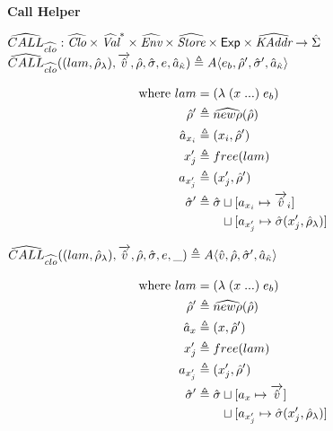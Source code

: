 \documentclass[12pt,draft]{article}
\newcommand{\A}[4]{A\langle #1 , #2 , #3 , #4 \rangle}
\begin{document}
\begin{multicols*}{2}
\begin{align*}
  \end{align*}
  \vfill\null
  \columnbreak
  \noindent\textbf{Call Helper}
  \begin{center}
    $\widehat{CALL}_{\widehat{clo}} : \widehat{\textit{Clo}} \times \widehat{\textit{Val}}^* \times \widehat{\textit{Env}}
    \times \widehat{\textit{Store}} \times \textsf{Exp} \times \widehat{\textit{KAddr}} \rightarrow \hat{\Sigma}$ \\
    $\aCALL_{\aclo}((lam , \aenv_{\lambda}) , \overrightarrow{\aval}, \aenv,\astore,e,\akaddr)
    \triangleq
    \A{e_b}{\aenv'}{\astore'}{\akaddr}$
  \end{center}
  \vspace{-7mm}
  \begin{align*}
    \text{where }
    lam &= (\lambda \; (x \; ...) \; e_b) \\
    \hat{\rho}' &\triangleq \widehat{new\rho}(\hat{\rho}) \\
    \hat{a}_{x_i} &\triangleq (x_i , \hat{\rho}') \\
    x_j' &\triangleq free(lam) \\
    a_{x_j'} &\triangleq (x_j' , \hat{\rho}') \\
    \hat{\sigma}' &\triangleq \hat{\sigma}
               \sqcup [a_{x_i} \mapsto \overrightarrow{\hat{v}}_i] \\
        &\;\;\;\;\;\:\,\,\sqcup [a_{x_j'} \mapsto \hat{\sigma}(x_j' , \hat{\rho}_{\lambda})]
  \end{align*}
  \begin{center}
    $\aCALL_{\aclo}((lam , \aenv_{\lambda}) , \overrightarrow{\aval} , \aenv , \astore , e , \_)
    \triangleq \A{\aval}{\aenv}{\astore'}{\akaddr}$
  \end{center}
  \vspace{-7mm}
  \begin{align*}
    \text{where }
    lam &= (\lambda \; (x \; ...) \; e_b) \\
    \aenv' &\triangleq \anewenv(\aenv) \\
    \abaddr_x &\triangleq (x , \aenv') \\
    x_j' &\triangleq free(lam) \\
    a_{x_j'} &\triangleq (x_j' , \aenv') \\
    \astore' &\triangleq \astore
               \sqcup [a_x \mapsto \overrightarrow{\aval}] \\
            &\;\;\;\;\;\:\,\,\sqcup [a_{x_j'} \mapsto \astore(x_j' , \aenv_{\lambda})]

\end{align*}
\end{multicols*}
\end{document}
